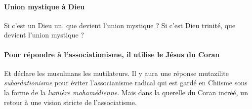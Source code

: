 \paragraph{Union mystique à Dieu} Si c'est un Dieu un, que devient l'union mystique ? Si c'est Dieu trinité, que devient l'union mystique ?

\paragraph{Pour répondre à l'associationisme, il utilise le Jésus du Coran} Et déclare les musulmans les mutilateurs. Il y aura une réponse mutazilite \textit{subordationisme} pour éviter l'associanisme radical qui est gardé en Chiisme sous la forme de la \textit{lumière mohamédienne}. Mais dans la querelle du Coran incréé, un retour à une vision stricte de l'associatisme.

